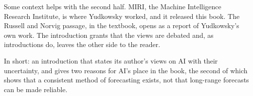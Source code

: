 \begin{afterword}
Some context helps with the second half. MIRI, the Machine Intelligence Research Institute, is where Yudkowsky worked, and it released this book. The Russell and Norvig passage, in the textbook, opens as a report of Yudkowsky's own work. The introduction grants that the views are debated and, as introductions do, leaves the other side to the reader.

In short: an introduction that states its author's views on AI with their uncertainty, and gives two reasons for AI's place in the book, the second of which shows that a consistent method of forecasting exists, not that long-range forecasts can be made reliable.
\end{afterword}
